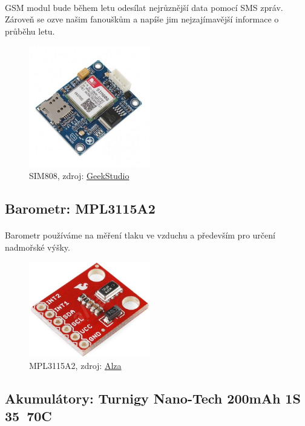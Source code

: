 \documentclass[a4paper]{report}
\begin{document}
\paragraph{} GSM modul bude během letu odesílat nejrůznější data pomocí SMS zpráv. Zároveň se ozve našim fanouškům a napíše jim nejzajímavější informace o průběhu letu.
\begin{figure}[H]
\caption{SIM808, zdroj: 
\href{https://www.geeker.co.nz/accessories/gsm/sim808-gprs-gsm-gps-module.html}{GeekStudio}}
\centering
\includegraphics[width=150pt]{gsm.jpg}
\end{figure}
\subsection{Barometr: MPL3115A2}
\paragraph{} Barometr používáme na měření tlaku ve vzduchu a především pro určení nadmořské výšky.
\begin{figure}[H]
\caption{MPL3115A2, zdroj: 
\href{https://www.alza.cz/sparkfun-vyskomer-tlakomer-mpl3115a2-d3752617.htm?kampan=adpla_vyrobci_Komponenty_programovatelne-stavebnice_c_2o1_SEN112a_1003803&gclid=Cj0KCQjwhoLWBRD9ARIsADIRaxSYJAwB_WEpQJOK6349QjdAecPFdzJR4etdCMYp0Hs_YAw0_bWlqW8aAi1yEALw_wcB}{Alza}}
\centering
\includegraphics[width=150pt]{barometr.jpg}
\end{figure}
\subsection{Akumulátory: Turnigy Nano-Tech 200mAh 1S 35~70C}
\end{document}
